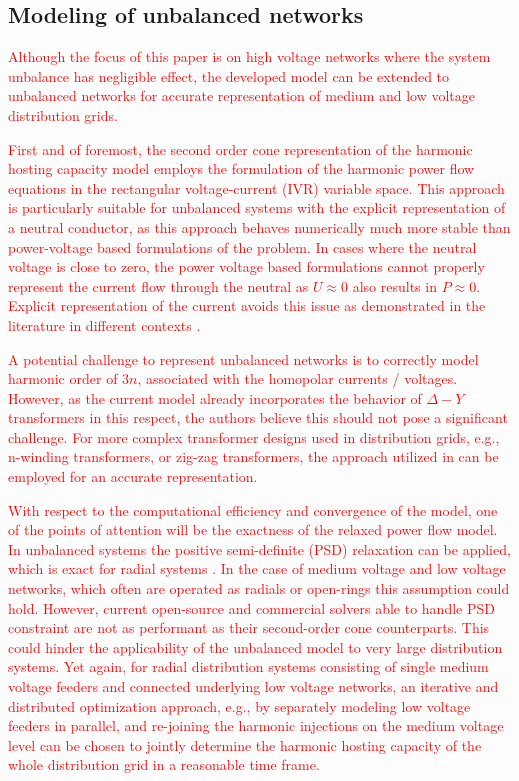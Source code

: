 \subsection{Modeling of unbalanced networks}

\textcolor{red}{Although the focus of this paper is on high voltage networks where the system unbalance has negligible effect, the developed model can be extended to unbalanced networks for accurate representation of medium and low voltage distribution grids.}

\textcolor{red}{First and of foremost, the second order cone representation of the harmonic hosting capacity model employs the formulation of the harmonic power flow equations in the rectangular voltage-current (IVR) variable space. This approach is particularly suitable for unbalanced systems with the explicit representation of a neutral conductor, as this approach behaves numerically much more stable than power-voltage based formulations of the problem. In cases where the neutral voltage is close to zero, the power voltage based formulations cannot properly represent the current flow through the neutral as $U \approx 0$ also results in $P \approx 0 $. Explicit representation of the current avoids this issue as demonstrated in the literature in different contexts \cite{claeys_applications_2021, jat_hybrid_2024}.}

\textcolor{red}{A potential challenge to represent unbalanced networks is to correctly model harmonic order of $3n$, associated with the homopolar currents / voltages. However, as the current model already incorporates the behavior of $\Delta - Y$ transformers in this respect, the authors believe this should not pose a significant challenge. For more complex transformer designs used in distribution grids, e.g., n-winding transformers, or zig-zag transformers, the approach utilized in \cite{claeys_decomposition_2020} can be employed for an accurate representation.}

\textcolor{red}{With respect to the computational efficiency and convergence of the model, one of the points of attention will be the exactness of the relaxed power flow model. In unbalanced systems the positive semi-definite (PSD) relaxation can be applied, which is exact for radial systems \cite{geth_pitfalls_2023}. In the case of medium voltage and low voltage networks, which often are operated as radials or open-rings this assumption could hold. However, current open-source and commercial solvers able to handle PSD constraint are not as performant as their second-order cone counterparts. This could hinder the applicability of the unbalanced model to very large distribution systems. Yet again, for radial distribution systems consisting of single medium voltage feeders and connected underlying low voltage networks, an iterative and distributed optimization approach, e.g., by separately modeling low voltage feeders in parallel, and re-joining the harmonic injections on the medium voltage level can be chosen to jointly determine the harmonic hosting capacity of the whole distribution grid in a reasonable time frame.}